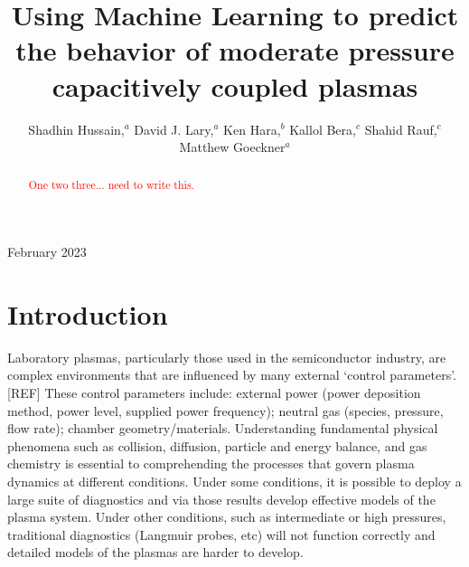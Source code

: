 \documentclass[12pt]{iopart}
\begin{document}
\title{Using Machine Learning to predict the behavior of moderate pressure capacitively coupled plasmas}
\author{Shadhin Hussain,$^{ a}$ David J. Lary,$^{ a}$ Ken Hara,$^{b}$ Kallol Bera,$^{c}$ Shahid Rauf,$^{c}$  Matthew Goeckner$^a$}

\address{$^a$Department of Physics, University of Texas at Dallas, Richardson TX, 75080 \\
$^b$Aeronautics and Astronautics, Stanford University,  Stanford CA, 94305 \\
$^c$Applied Materials Corp, Santa Clara, CA 95054}
\vspace{10pt}
\begin{indented}
\item[]February 2023
\end{indented}

\begin{abstract}
\textcolor{red}{One two three... need to write this.}
\end{abstract}

%
%
%
% 
%



\section{Introduction}
Laboratory plasmas, particularly those used in the semiconductor industry,  are complex environments that are influenced by many external `control parameters'.[REF] These control parameters include: external power (power deposition method, power level, supplied power frequency); neutral gas (species, pressure, flow rate); chamber geometry/materials.  Understanding fundamental physical phenomena such as collision, diffusion, particle and energy balance, and gas chemistry is essential to comprehending the processes that govern plasma dynamics at different conditions.  Under some conditions, it is possible to deploy a large suite of diagnostics and via those results develop effective models of the plasma system.  Under other conditions, such as intermediate or high pressures, traditional diagnostics (Langmuir probes, etc) will not function correctly and detailed models of the plasmas are harder to develop.  
\end{document}
